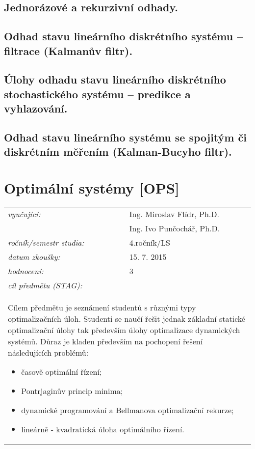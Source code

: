\subsection{Jednorázové a rekurzivní odhady.}

\subsection{Odhad stavu lineárního diskrétního systému – filtrace (Kalmanův filtr).}

\subsection{Úlohy odhadu stavu lineárního diskrétního stochastického systému – predikce a vyhlazování.}

\subsection{Odhad stavu lineárního systému se spojitým či diskrétním měřením (Kalman-Bucyho filtr).}

\section{Optimální systémy [OPS]}

\begin{table}[H]
\centering
\begin{tabular}{p{4cm} p{12cm}}
\textit{vyučující:}             & Ing. Miroslav Flídr, Ph.D. \\
								 & Ing. Ivo Punčochář, Ph.D. \\
\textit{ročník/semestr studia:} & 4.ročník/LS \\
\textit{datum zkoušky:}         & 15. 7. 2015 \\
\textit{hodnocení:}             & 3 \\
\textit{cíl předmětu (STAG):}   & \\
\multicolumn{2}{p{16cm}}{Cílem předmětu je seznámení studentů s různými typy optimalizačních úloh. Studenti se naučí řešit jednak základní statické optimalizační úlohy tak především úlohy optimalizace dynamických systémů. Důraz je kladen především na pochopení řešení následujících problémů: 
\begin{itemize}
\item časově optimální řízení;
\item Pontrjaginův princip minima;
\item dynamické programování a Bellmanova optimalizační rekurze;
\item lineárně - kvadratická úloha optimálního řízení.
\end{itemize}}
\end{tabular}
\end{table}

